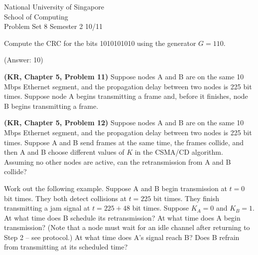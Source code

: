 \documentclass[a4paper,11pt]{exam}
\begin{document}
    \extraheadheight{.5in}
    {\large\sf National University of Singapore\\ School of Computing \\
    \LARGE\sf Problem Set 8}%
    {\large\sf Semester 2 10/11}
    \firstpageheadrule
    \pagestyle{headandfoot}

    \begin{questions}
	\question 
	Compute the CRC for the bits 1010101010 using the generator $G = 110$.
	
	(Answer: 10)

	\question \textbf{(KR, Chapter 5, Problem 11)}
	Suppose nodes A and B are on the same 10 Mbps Ethernet segment, and the propagation delay between 
	two nodes is 225 bit times.  Suppose node A begins transmitting a frame and, before it finishes, node B
	begins transmitting a frame.


	\question \textbf{(KR, Chapter 5, Problem 12)}
	Suppose nodes A and B are on the same 10 Mbps Ethernet segment, and the propagation delay between 
	two nodes is 225 bit times.  Suppose A and B send frames at the same time, the frames collide,
	and then A and B choose different values of $K$ in the CSMA/CD algorithm.  Assuming no other nodes are
	active, can the retransmission from A and B collide?

	Work out the following example.  Suppose A and B begin transmission at $t = 0$ bit times.  They both
	detect collisions at $t = 225$ bit times.  They finish transmitting a jam signal at 
	$t = 225 + 48$ bit times. Suppose $K_A = 0$ and $K_B = 1$.  At what time does B schedule its
	retransmission?  At what time does A begin transmission?  (Note that a node must wait for an idle channel
	after returning to Step 2 -- see protocol.)  At what time does A's signal reach B? Does B refrain from
	transmitting at its scheduled time?
    \end{questions}
\end{document}
